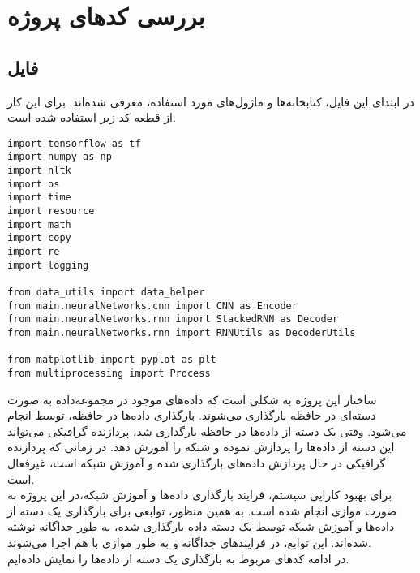 \section*{بررسی کد‌های پروژه}
\subsection*{فایل  }

در ابتدای این فایل، کتابخانه‌ها و ماژول‌های مورد استفاده، معرفی شده‌اند. برای این کار از قطعه کد زیر استفاده شده است.
\begin{latin}
\begin{verbatim}
import tensorflow as tf
import numpy as np
import nltk
import os
import time
import resource
import math
import copy
import re
import logging

from data_utils import data_helper
from main.neuralNetworks.cnn import CNN as Encoder
from main.neuralNetworks.rnn import StackedRNN as Decoder
from main.neuralNetworks.rnn import RNNUtils as DecoderUtils

from matplotlib import pyplot as plt
from multiprocessing import Process
\end{verbatim}
\end{latin}

ساختار این پروژه به شکلی است که داده‌های موجود در مجموعه‌داده به صورت دسته‌ای در حافظه بارگذاری می‌شوند. بارگذاری داده‌ها در حافظه، توسط  انجام می‌شود. وقتی یک دسته از داده‌ها در حافظه بارگذاری شد، پردازنده گرافیکی می‌تواند این دسته از داده‌ها را پردازش نموده و شبکه را آموزش دهد. در زمانی که پردازنده گرافیکی در حال پردازش داده‌های بارگذاری شده و آموزش شبکه است،  غیرفعال است. 
\\
برای بهبود کارایی سیستم، فرایند بارگذاری داده‌ها و آموزش شبکه،‌در این پروژه به صورت موازی انجام شده است. به همین منظور، توابعی برای بارگذاری یک دسته از داده‌ها و آموزش شبکه توسط یک دسته داده بارگذاری شده، به طور جداگانه نوشته شده‌اند. این توابع، در فرایندهای جداگانه و به طور موازی با هم اجرا می‌شوند.
\\
در ادامه کدهای مربوط به بارگذاری یک دسته از داده‌ها را نمایش داده‌ایم.


